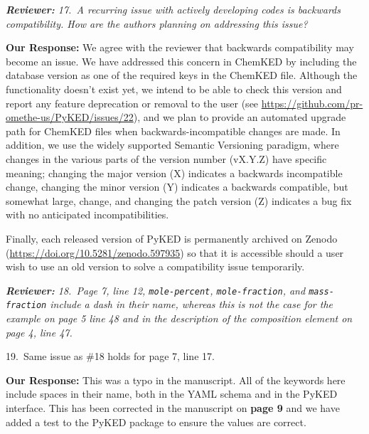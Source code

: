 \documentclass[a4paper,10pt]{elsarticle}
\newenvironment{reviewer}{\vspace{0.5\baselineskip}\begingroup\itshape\textbf{Reviewer:}}{\endgroup}
\newenvironment{response}{\textbf{Our Response:}}{\vspace{0.5\baselineskip}}
\begin{document}
\begin{reviewer}
    17.~A recurring issue with actively developing codes is backwards compatibility. How are the
    authors planning on addressing this issue?
\end{reviewer}

\begin{response}
    We agree with the reviewer that backwards compatibility may become an issue. We have addressed
    this concern in ChemKED by including the database version as one of the required keys in the
    ChemKED file. Although the functionality doesn't exist yet, we intend to be able to check this
    version and report any feature deprecation or removal to the user (see
    \url{https://github.com/pr-omethe-us/PyKED/issues/22}), and we plan to provide an automated
    upgrade path for ChemKED files when backwards-incompatible changes are made. In addition, we use
    the widely supported Semantic Versioning paradigm, where changes in the various parts of the
    version number (vX.Y.Z) have specific meaning; changing the major version (X) indicates a
    backwards incompatible change, changing the minor version (Y) indicates a backwards compatible,
    but somewhat large, change, and changing the patch version (Z) indicates a bug fix with no
    anticipated incompatibilities.

    Finally, each released version of PyKED is permanently archived on Zenodo
    (\url{https://doi.org/10.5281/zenodo.597935}) so that it is accessible should a user wish to use
    an old version to solve a compatibility issue temporarily.
\end{response}

\begin{reviewer}
    18.~Page 7, line 12, \texttt{mole-percent}, \texttt{mole-fraction}, and \texttt{mass-fraction}
    include a dash in their name, whereas this is not the case for the example on page 5 line 48 and
    in the description of the composition element on page 4, line 47.

    19.~Same issue as \#18 holds for page 7, line 17.
\end{reviewer}

\begin{response}
    This was a typo in the manuscript. All of the keywords here include spaces in their name, both
    in the YAML schema and in the PyKED interface. This has been corrected in the manuscript on
    \textbf{page 9} and we have added a test to the PyKED package to ensure the values are correct.
\end{response}
\end{document}
